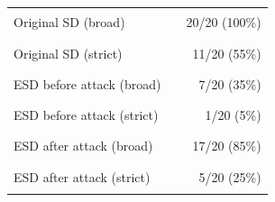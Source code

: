 \begin{tabular}{llr}
Original SD (broad) & \rule{5.00cm}{1.2ex} & 20/20 (100\%) \\
Original SD (strict) & \rule{2.75cm}{1.2ex} & 11/20 (55\%) \\
ESD before attack (broad) & \rule{1.75cm}{1.2ex} & 7/20 (35\%) \\
ESD before attack (strict) & \rule{0.25cm}{1.2ex} & 1/20 (5\%) \\
ESD after attack (broad) & \rule{4.25cm}{1.2ex} & 17/20 (85\%) \\
ESD after attack (strict) & \rule{1.25cm}{1.2ex} & 5/20 (25\%) \\
\end{tabular}
